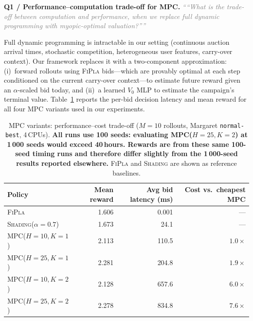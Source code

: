 \documentclass[11pt]{article}
\newcommand{\reviewer}[1]{\textit{\textcolor{gray}{``#1''}}}
\begin{document}
\bigskip

\noindent\textbf{Q1 / Performance--computation trade-off for MPC.}\quad
\reviewer{``What is the trade-off between computation and performance, when we replace
full dynamic programming with myopic-optimal valuation?''}

\medskip

Full dynamic programming is intractable in our setting (continuous auction arrival
times, stochastic competition, heterogeneous user features, carry-over context).
Our framework replaces it with a two-component approximation: (i)~forward rollouts
using \textsc{FiPla} bids---which are provably optimal at each step conditioned on
the current carry-over context---to estimate future reward given an $\alpha$-scaled
bid today, and (ii)~a learned $V_0$ MLP to estimate the campaign's terminal value.
Table~\ref{tab:mpc-perf-cost} reports the per-bid decision latency and mean reward for
all four MPC variants used in our experiments.

\begin{table}[h!]
\centering
\caption{MPC variants: performance--cost trade-off
         ($M{=}10$ rollouts, Margaret \texttt{normal-best}, 4\,CPUs).
         \textbf{All runs use 100 seeds: evaluating \textsc{MPC}($H{=}25,K{=}2$) at
         1\,000 seeds would exceed 40\,hours.  Rewards are from these same 100-seed
         timing runs and therefore differ slightly from the 1\,000-seed results
         reported elsewhere.}
         \textsc{FiPla} and \textsc{Shading} are shown as reference baselines.}
\label{tab:mpc-perf-cost}
\begin{tabular}{lrrr}
\toprule
Policy & Mean reward & Avg bid latency (ms) & Cost vs.\ cheapest MPC \\
\midrule
\textsc{FiPla}                       & 1.606 &   0.001 &          — \\
\textsc{Shading}($\alpha{=}0.7$)     & 1.673 &    24.1 &          — \\
\midrule
\textsc{MPC}($H{=}10,K{=}1$)        & 2.113 &  110.5  &  $1.0\times$ \\
\textsc{MPC}($H{=}25,K{=}1$)        & 2.281 &  204.8  &  $1.9\times$ \\
\textsc{MPC}($H{=}10,K{=}2$)        & 2.128 &  657.6  &  $6.0\times$ \\
\textsc{MPC}($H{=}25,K{=}2$)        & 2.278 &  834.8  &  $7.6\times$ \\
\bottomrule
\end{tabular}
\end{table}
\end{document}
